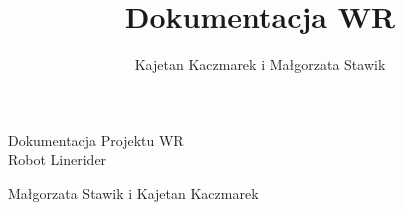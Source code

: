 \documentclass[10pt,a4paper]{report}
\author{Kajetan Kaczmarek i Małgorzata Stawik}
\title{Dokumentacja WR}
\begin{document}
\begin{center}
\begin{huge}
Dokumentacja Projektu WR \\
Robot Linerider\\
\vspace{0.5cm}
\end{huge}
\begin{LARGE}
Małgorzata Stawik i Kajetan Kaczmarek
\end{LARGE}
\end{center}


\end{document}
